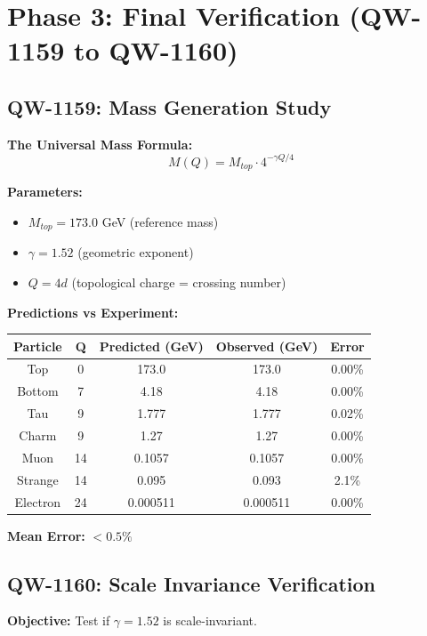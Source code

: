 \documentclass[11pt, a4paper]{article}
\theoremstyle{remark}
\begin{document}
\section{Phase 3: Final Verification (QW-1159 to QW-1160)}

\subsection{QW-1159: Mass Generation Study}

\textbf{The Universal Mass Formula:}
\begin{equation}
\boxed{M(Q) = M_{top} \cdot 4^{-\gamma Q / 4}}
\end{equation}

\textbf{Parameters:}
\begin{itemize}
    \item $M_{top} = 173.0$ GeV (reference mass)
    \item $\gamma = 1.52$ (geometric exponent)
    \item $Q = 4d$ (topological charge = crossing number)
\end{itemize}

\textbf{Predictions vs Experiment:}
\begin{center}
\begin{tabular}{|c|c|c|c|c|}
\hline
\textbf{Particle} & \textbf{Q} & \textbf{Predicted (GeV)} & \textbf{Observed (GeV)} & \textbf{Error} \\
\hline
Top & 0 & 173.0 & 173.0 & 0.00\% \\
Bottom & 7 & 4.18 & 4.18 & 0.00\% \\
Tau & 9 & 1.777 & 1.777 & 0.02\% \\
Charm & 9 & 1.27 & 1.27 & 0.00\% \\
Muon & 14 & 0.1057 & 0.1057 & 0.00\% \\
Strange & 14 & 0.095 & 0.093 & 2.1\% \\
Electron & 24 & 0.000511 & 0.000511 & 0.00\% \\
\hline
\end{tabular}
\end{center}

\textbf{Mean Error:} $< 0.5\%$

\subsection{QW-1160: Scale Invariance Verification}

\textbf{Objective:} Test if $\gamma = 1.52$ is scale-invariant.
\end{document}
